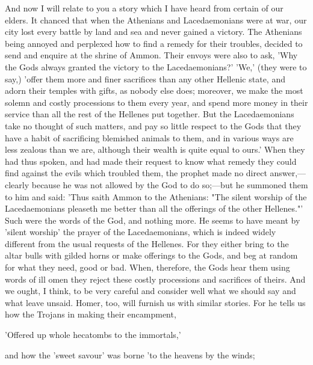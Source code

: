 \documentclass[11pt,letter]{article}
\begin{document}
\par  And now I will relate to you a story which I have heard from certain of our elders. It chanced that when the Athenians and Lacedaemonians were at war, our city lost every battle by land and sea and never gained a victory. The Athenians being annoyed and perplexed how to find a remedy for their troubles, decided to send and enquire at the shrine of Ammon. Their envoys were also to ask, 'Why the Gods always granted the victory to the Lacedaemonians?' 'We,' (they were to say,) 'offer them more and finer sacrifices than any other Hellenic state, and adorn their temples with gifts, as nobody else does; moreover, we make the most solemn and costly processions to them every year, and spend more money in their service than all the rest of the Hellenes put together. But the Lacedaemonians take no thought of such matters, and pay so little respect to the Gods that they have a habit of sacrificing blemished animals to them, and in various ways are less zealous than we are, although their wealth is quite equal to ours.' When they had thus spoken, and had made their request to know what remedy they could find against the evils which troubled them, the prophet made no direct answer,—clearly because he was not allowed by the God to do so;—but he summoned them to him and said: 'Thus saith Ammon to the Athenians: "The silent worship of the Lacedaemonians pleaseth me better than all the offerings of the other Hellenes."' Such were the words of the God, and nothing more. He seems to have meant by 'silent worship' the prayer of the Lacedaemonians, which is indeed widely different from the usual requests of the Hellenes. For they either bring to the altar bulls with gilded horns or make offerings to the Gods, and beg at random for what they need, good or bad. When, therefore, the Gods hear them using words of ill omen they reject these costly processions and sacrifices of theirs. And we ought, I think, to be very careful and consider well what we should say and what leave unsaid. Homer, too, will furnish us with similar stories. For he tells us how the Trojans in making their encampment,

\par  'Offered up whole hecatombs to the immortals,'

\par  and how the 'sweet savour' was borne 'to the heavens by the winds;
 
\end{document}
